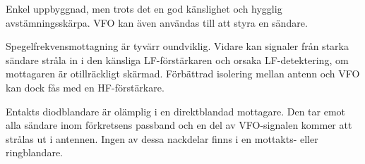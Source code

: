 Enkel uppbyggnad, men trots det en god känslighet och hygglig avstämningsskärpa.
VFO kan även användas till att styra en sändare.

Spegelfrekvensmottagning är tyvärr oundviklig.
Vidare kan signaler från starka sändare stråla in i den känsliga LF-förstärkaren
och orsaka LF-detektering, om mottagaren är otillräckligt skärmad.
Förbättrad isolering mellan antenn och VFO kan dock fås med en HF-förstärkare.

Entakts diodblandare är olämplig i en direktblandad mottagare.
Den tar emot alla sändare inom förkretsens passband och en del av VFO-signalen
kommer att strålas ut i antennen.
Ingen av dessa nackdelar finns i en mottakts- eller ringblandare.
